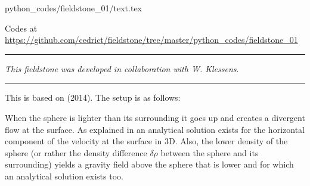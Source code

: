 \begin{flushright} {\tiny {\color{gray} python\_codes/fieldstone\_01/text.tex}} \end{flushright}

%

\begin{center}
Codes at \url{https://github.com/cedrict/fieldstone/tree/master/python_codes/fieldstone_01}
\end{center}

\par\noindent\rule{\textwidth}{0.4pt}

{\sl This fieldstone was developed in collaboration with W. Klessens}. 

\par\noindent\rule{\textwidth}{0.4pt}

This \stone is based on \textcite{bakp14} (2014).
The setup is as follows:

\begin{center}
\end{center}

When the sphere is lighter than its surrounding it goes up and creates a 
divergent flow at the surface. As explained in \cite{bakp14} an analytical 
solution exists for the horizontal component of the velocity at the surface in 3D. 
Also, the lower density of the sphere (or rather the density difference $\delta\rho$
between the sphere and its surrounding) yields a gravity field 
above the sphere that is lower and for which an analytical solution exists too.

